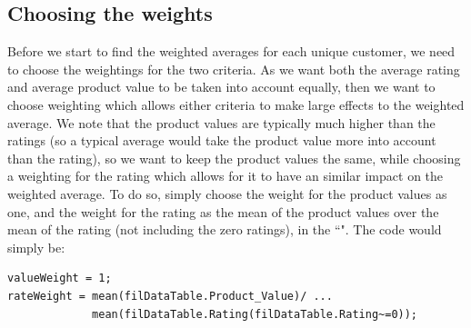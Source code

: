 \documentclass[12pt]{article}
\newcommand{\hl}[1]{``\path{#1}"}
\begin{document}
\subsection{Choosing the weights}
Before we start to find the weighted averages for each unique customer, we need to choose the weightings for the two criteria. As we want both the average rating and average product value to be taken into account equally, then we want to choose weighting which allows either criteria to make large effects to the weighted average. We note that the product values are typically much higher than the ratings (so a typical average would take the product value more into account than the rating), so we want to keep the product values the same, while choosing a weighting for the rating which allows for it to have an similar impact on the weighted average. To do so, simply choose the weight for the product values as one, and the weight for the rating as the mean of the product values over the mean of the rating (not including the zero ratings), in the \hl{filDataTable}. The code would simply be:
\begin{lstlisting}[title={Find the weights}]
% Find weights:
valueWeight = 1;
rateWeight = mean(filDataTable.Product_Value)/ ...
             mean(filDataTable.Rating(filDataTable.Rating~=0));
\end{lstlisting}
\end{document}
